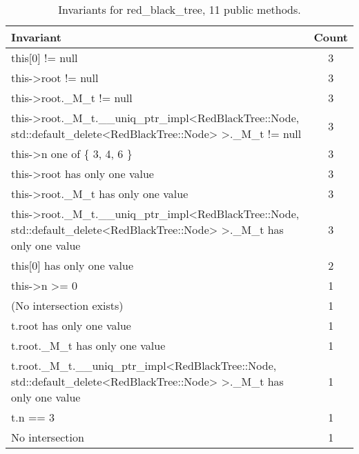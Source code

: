 \begin{table}[ht]
\centering
\scriptsize
\caption{Invariants for red\_black\_tree, 11 public methods.}
\label{red_black_tree_daikon}
\begin{tabular}{|l|c|}
\hline
Invariant & Count \\
\hline
this[0] != null & 3 \\
this->root != null & 3 \\
this->root.\_M\_t != null & 3 \\
this->root.\_M\_t.\_\_uniq\_ptr\_impl<RedBlackTree::Node, std::default\_delete<RedBlackTree::Node> >.\_M\_t != null & 3 \\
this->n one of \{ 3, 4, 6 \} & 3 \\
this->root has only one value & 3 \\
this->root.\_M\_t has only one value & 3 \\
this->root.\_M\_t.\_\_uniq\_ptr\_impl<RedBlackTree::Node, std::default\_delete<RedBlackTree::Node> >.\_M\_t has only one value & 3 \\
this[0] has only one value & 2 \\
this->n >= 0 & 1 \\
(No intersection exists) & 1 \\
t.root has only one value & 1 \\
t.root.\_M\_t has only one value & 1 \\
t.root.\_M\_t.\_\_uniq\_ptr\_impl<RedBlackTree::Node, std::default\_delete<RedBlackTree::Node> >.\_M\_t has only one value & 1 \\
t.n == 3 & 1 \\
No intersection & 1 \\
\hline
\end{tabular}
\end{table}

